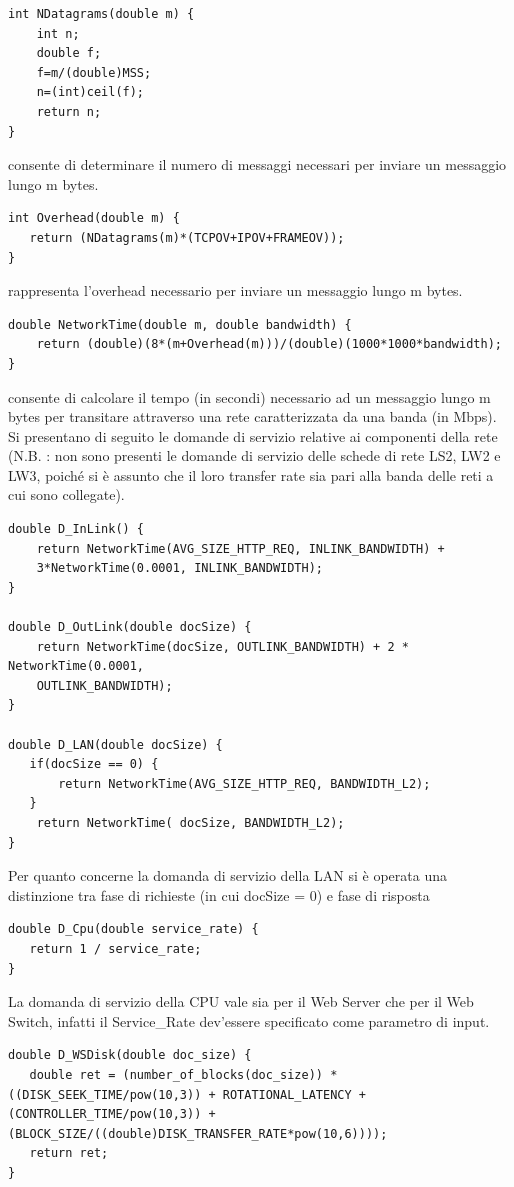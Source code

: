\begin{lstlisting}
int NDatagrams(double m) { 
	int n; 
	double f; 
	f=m/(double)MSS;
	n=(int)ceil(f); 
	return n; 
} 
\end{lstlisting}
 consente di determinare il numero di messaggi necessari per inviare un messaggio lungo m bytes.
\begin{lstlisting}
int Overhead(double m) { 
   return (NDatagrams(m)*(TCPOV+IPOV+FRAMEOV)); 
}
\end{lstlisting}
 rappresenta l'overhead necessario per inviare un messaggio lungo m bytes.
\begin{lstlisting}
double NetworkTime(double m, double bandwidth) { 
	return (double)(8*(m+Overhead(m)))/(double)(1000*1000*bandwidth); 
}
\end{lstlisting}
 consente di calcolare il tempo (in secondi) necessario ad un messaggio lungo m bytes per transitare attraverso una rete caratterizzata da una banda  (in Mbps).
Si presentano di seguito le domande di servizio relative ai componenti della rete (N.B. : non sono presenti le domande di servizio delle schede di rete LS2, LW2 e LW3, poiché si è assunto che il loro transfer rate sia pari alla banda delle reti a cui sono collegate).
\begin{lstlisting}
double D_InLink() { 
    return NetworkTime(AVG_SIZE_HTTP_REQ, INLINK_BANDWIDTH) +    
    3*NetworkTime(0.0001, INLINK_BANDWIDTH); 
} 

double D_OutLink(double docSize) { 
    return NetworkTime(docSize, OUTLINK_BANDWIDTH) + 2 * NetworkTime(0.0001,   
    OUTLINK_BANDWIDTH); 
} 

double D_LAN(double docSize) { 
   if(docSize == 0) { 
       return NetworkTime(AVG_SIZE_HTTP_REQ, BANDWIDTH_L2); 
   } 
    return NetworkTime( docSize, BANDWIDTH_L2); 
} 
\end{lstlisting}
Per quanto concerne la domanda di servizio della LAN si è operata una distinzione tra fase di richieste (in cui docSize = 0) e fase di risposta
\begin{lstlisting}
double D_Cpu(double service_rate) { 
   return 1 / service_rate; 
}
\end{lstlisting}
La domanda di servizio della CPU vale sia per il Web Server che per il Web Switch, infatti il Service\_Rate dev'essere specificato come parametro di input.
\begin{lstlisting}
double D_WSDisk(double doc_size) { 
   double ret = (number_of_blocks(doc_size)) * ((DISK_SEEK_TIME/pow(10,3)) + ROTATIONAL_LATENCY + (CONTROLLER_TIME/pow(10,3)) + (BLOCK_SIZE/((double)DISK_TRANSFER_RATE*pow(10,6)))); 
   return ret; 
} 
\end{lstlisting}
